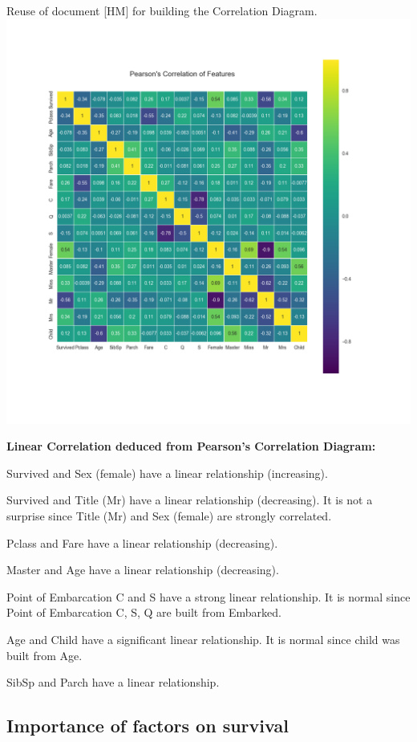 \documentclass[11pt]{article}
\makeatletter
\def\maxwidth{\ifdim\Gin@nat@width>\linewidth\linewidth
    \else\Gin@nat@width\fi}
\let\Oldincludegraphics\includegraphics
\renewcommand{\includegraphics}[1]{\Oldincludegraphics[width=.8\maxwidth]{#1}}
\makeatother
\begin{document}
    Reuse of document {[}HM{]} for building the Correlation Diagram.
\includegraphics{PearsonCorrelationOfFeatures.png}

    \textbf{Linear Correlation deduced from Pearson's Correlation Diagram:}

Survived and Sex (female) have a linear relationship (increasing).

Survived and Title (Mr) have a linear relationship (decreasing). It is
not a surprise since Title (Mr) and Sex (female) are strongly
correlated.

Pclass and Fare have a linear relationship (decreasing).

Master and Age have a linear relationship (decreasing).

Point of Embarcation C and S have a strong linear relationship. It is
normal since Point of Embarcation C, S, Q are built from Embarked.

Age and Child have a significant linear relationship. It is normal since
child was built from Age.

SibSp and Parch have a linear relationship.

    \subsection{Importance of factors on
survival}\label{importance-of-factors-on-survival}
\end{document}
